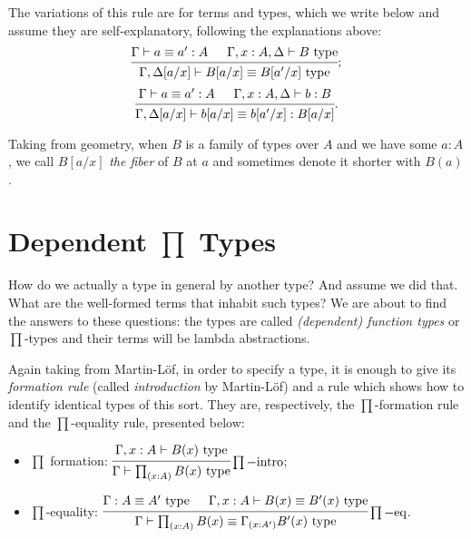 \begin{enumerate}[(1)]
  The variations of this rule are for terms and types, which we write below
  and assume they are self-explanatory, following the explanations above:
  \[
    \begin{prooftree}
      \hypo{\Gamma \vdash a \equiv a' : A}
      \hypo{\Gamma, x : A, \Delta \vdash B \text{ type}}
      \infer2{\Gamma, \Delta[a/x] \vdash B[a/x] \equiv B[a'/x] \text{ type}}
    \end{prooftree};
  \]
  \[
    \begin{prooftree}
      \hypo{\Gamma \vdash a \equiv a' : A}
      \hypo{\Gamma, x : A, \Delta \vdash b : B}
      \infer2{\Gamma, \Delta[a/x] \vdash b[a/x] \equiv b[a'/x] : B[a/x]}
    \end{prooftree}.
  \]
\end{enumerate}

Taking from geometry, when $ B $ is a family of types over $ A $ and we
have some $ a : A $, we call $ B[a/x] $ \emph{the fiber} of $ B $ at
$ a $ and sometimes denote it shorter with $ B(a) $.

\section{Dependent $ \prod $ Types}
\label{sec:dep-pi}

\indent\indent How do we actually  a type in general by another type?
And assume we did that. What are the well-formed terms that inhabit
such types? We are about to find the answers to these questions:
the types are called \emph{(dependent) function types} or
$ \prod $-types and their terms will be lambda abstractions.

Again taking from Martin-L\"{o}f, in order to specify a type, it
is enough to give its \emph{formation rule} (called \emph{introduction}
by Martin-L\"{o}f) and a rule which shows how to identify identical
types of this sort. They are, respectively, the $ \prod $-formation
rule and the $ \prod $-equality rule, presented below:
\begin{itemize}
\item $ \prod $ formation:
  $ \begin{prooftree}
    \hypo{\Gamma, x : A \vdash B(x) \text{ type}}
    \infer1{\Gamma \vdash \prod_{(x : A)} B(x) \text{ type}}
  \end{prooftree} \prod-\text{intro}
  $;
\item $ \prod $-equality:
  $ \begin{prooftree}
    \hypo{\Gamma : A \equiv A' \text{ type}}
    \hypo{\Gamma, x : A \vdash B(x) \equiv B'(x) \text{ type}}
    \infer2{\Gamma \vdash \prod_{(x : A)} B(x) \equiv %
      \Gamma_{(x : A')} B'(x) \text{ type}}
  \end{prooftree} \prod-\text{eq}
  $.
\end{itemize}

